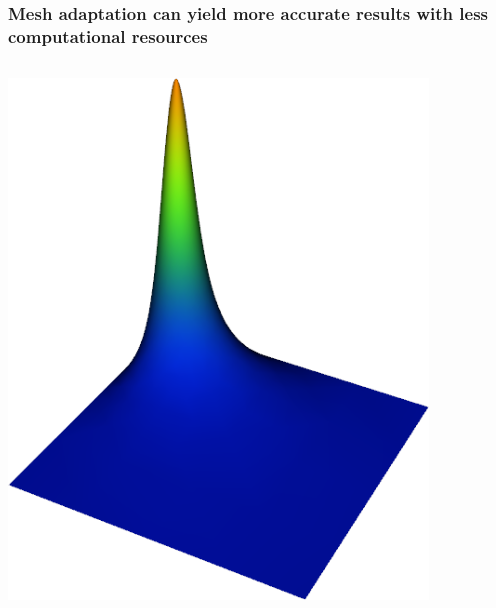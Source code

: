 \begin{frame}
  \frametitle{Mesh adaptation can yield more accurate
  results with less computational resources}
  \begin{columns}
    \begin{column}{0.6\textwidth}
      \includegraphics[width=0.9\textwidth]{png/exact-solution-alpha.png}
    \end{column}
    \begin{column}{0.4\textwidth}
    \end{column}
  \end{columns}
\end{frame}
%
